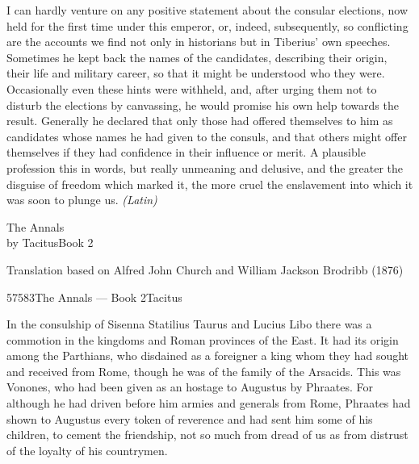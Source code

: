 
I can hardly venture on any positive statement about the consular elections, now held for the first time under this emperor, or, indeed, subsequently, so conflicting are the accounts we find not only in historians but in Tiberius' own speeches. Sometimes he kept back the names of the candidates, describing their origin, their life and military career, so that it might be understood who they were. Occasionally even these hints were withheld, and, after urging them not to disturb the elections by canvassing, he would promise his own help towards the result. Generally he declared that only those had offered themselves to him as candidates whose names he had given to the consuls, and that others might offer themselves if they had confidence in their influence or merit. A plausible profession this in words, but really unmeaning and delusive, and the greater the disguise of freedom which marked it, the more cruel the enslavement into which it was soon to plunge us. \emph{(Latin)}


The Annals\\
by TacitusBook 2

Translation based on Alfred John Church and William Jackson Brodribb (1876)

57583The Annals — Book 2Tacitus


In the consulship of Sisenna Statilius Taurus and Lucius Libo there was a commotion in the kingdoms and Roman provinces of the East. It had its origin among the Parthians, who disdained as a foreigner a king whom they had sought and received from Rome, though he was of the family of the Arsacids. This was Vonones, who had been given as an hostage to Augustus by Phraates. For although he had driven before him armies and generals from Rome, Phraates had shown to Augustus every token of reverence and had sent him some of his children, to cement the friendship, not so much from dread of us as from distrust of the loyalty of his countrymen.


